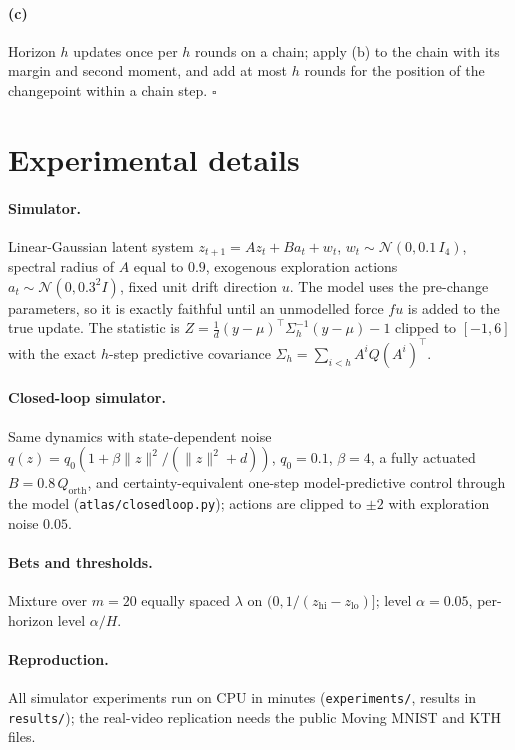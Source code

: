 \paragraph{(c)} Horizon $h$ updates once per $h$ rounds on a chain; apply (b) to the chain with its margin and second moment, and add at most $h$ rounds for the position of the changepoint within a chain step. \hfill$\square$

\section{Experimental details}\label{app:details}

\paragraph{Simulator.} Linear-Gaussian latent system $z_{t+1}=Az_t+Ba_t+w_t$, $w_t\sim\mathcal N(0,0.1\,I_4)$, spectral radius of $A$ equal to $0.9$, exogenous exploration actions $a_t\sim\mathcal N(0,0.3^2I)$,
fixed unit drift direction $u$. The model uses the pre-change parameters, so it is exactly faithful until an unmodelled force $f u$ is added to the true update. The statistic is
$Z=\frac1d(y-\mu)^\top\Sigma_h^{-1}(y-\mu)-1$ clipped to $[-1,6]$ with the exact $h$-step predictive covariance $\Sigma_h=\sum_{i<h}A^iQ(A^i)^\top$.

\paragraph{Closed-loop simulator.} Same dynamics with state-dependent noise $q(z)=q_0(1+\beta\|z\|^2/(\|z\|^2+d))$, $q_0=0.1$, $\beta=4$, a fully actuated $B=0.8\,Q_{\mathrm{orth}}$, and certainty-equivalent one-step model-predictive control through the model
(\texttt{atlas/closedloop.py}); actions are clipped to $\pm2$ with exploration noise $0.05$.

\paragraph{Bets and thresholds.} Mixture over $m=20$ equally spaced $\lambda$ on $(0,1/(z_{\mathrm{hi}}-z_{\mathrm{lo}})]$; level $\alpha=0.05$, per-horizon level $\alpha/H$.

\paragraph{Reproduction.} All simulator experiments run on CPU in minutes (\texttt{experiments/}, results in \texttt{results/}); the real-video replication needs the public Moving MNIST and KTH files.

